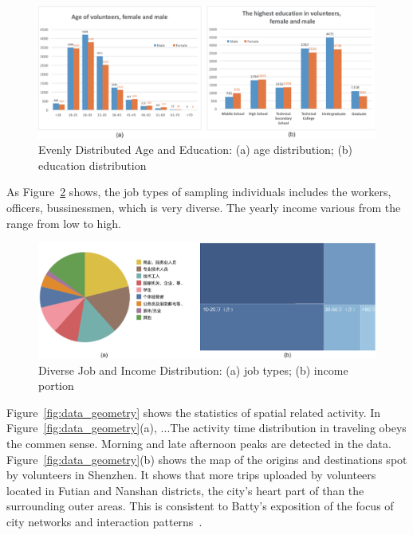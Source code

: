 
\begin{figure}[htb!]
 \centering %
 \includegraphics[width=\columnwidth]{pictures/data1}
 \caption{Evenly Distributed Age and Education: (a) age distribution; (b) education distribution}
 \label{fig:data_age_edu}
\end{figure}

As Figure~\ref{fig:data_job_inc} shows, the job types of sampling individuals includes the workers, officers, bussinessmen, which is very diverse. The yearly income various from the range from low to high.

\begin{figure}[htb!]
 \centering %
 \includegraphics[width=\columnwidth]{pictures/data2}
 \caption{Diverse Job and Income Distribution: (a) job types; (b) income portion}
 \label{fig:data_job_inc}
\end{figure}


Figure~\ref{fig:data_geometry} shows the statistics of spatial related activity. In Figure~\ref{fig:data_geometry}(a), ...The activity time distribution in traveling obeys the commen sense. Morning and late afternoon peaks are detected in the data. Figure~\ref{fig:data_geometry}(b) shows the map of the origins and destinations spot by volunteers in Shenzhen. It shows that more trips uploaded by volunteers located in Futian and Nanshan districts, the city's heart part of than the surrounding outer areas. This is consistent to Batty's exposition of the focus of city networks and interaction patterns~\cite{batty2013new}. 

